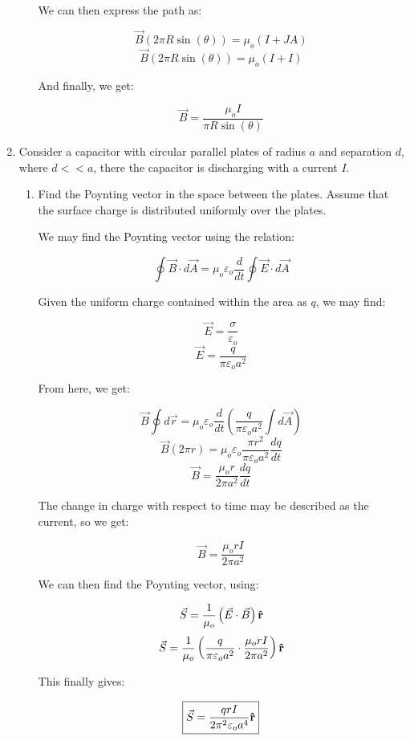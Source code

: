 \begin{enumerate}
\begin{enumerate}
        We can then express the path as:

        $$\vec{B}(2\pi R\sin(\theta))=\mu_o(I+JA)$$
        $$\vec{B}(2\pi R\sin(\theta))=\mu_o(I+I)$$

        And finally, we get:

        $$\boxed{\vec{B}=\frac{\mu_o I}{\pi R\sin(\theta)}}$$

    \end{enumerate}

  \item Consider a capacitor with circular parallel plates of radius $a$ and separation $d$, where $d<<a$, there the capacitor is discharging with a current $I$.

    \begin{enumerate}

      \item Find the Poynting vector in the space between the plates. Assume that the surface charge is distributed uniformly over the plates.

        We may find the Poynting vector using the relation:

        $$\oint \vec{B}\cdot d\vec{A}=\mu_o\varepsilon_o\frac{d}{dt}\oint \vec{E}\cdot d\vec{A}$$

        Given the uniform charge contained within the area as $q$, we may find:

        $$\vec{E}=\frac{\sigma}{\varepsilon_o}$$
        $$\vec{E}=\frac{q}{\pi\varepsilon_o a^2}$$

        From here, we get:

        $$\vec{B}\oint d\vec{r}=\mu_o\varepsilon_o\frac{d}{dt}\left(\frac{q}{\pi\varepsilon_o a^2} \int d\vec{A}\right)$$
        $$\vec{B}(2\pi r)=\mu_o\varepsilon_o\frac{\pi r^2}{\pi\varepsilon_o a^2}\frac{dq}{dt}$$
        $$\vec{B}=\frac{\mu_or}{2\pi a^2}\frac{dq}{dt}$$

        The change in charge with respect to time may be described as the current, so we get:

        $$\vec{B}=\frac{\mu_orI}{2\pi a^2}$$

        We can then find the Poynting vector, using:

        $$\vec{S}=\frac{1}{\mu_o}\left( \vec{E}\cdot\vec{B} \right)\bold{\hat{r}}$$
        $$\vec{S}=\frac{1}{\mu_o}\left( \frac{q}{\pi\varepsilon_o a^2}\cdot\frac{\mu_orI}{2\pi a^2} \right)\bold{\hat{r}}$$

        This finally gives:

        $$\boxed{\vec{S}=\frac{qrI}{2\pi^2\varepsilon_o a^4}\bold{\hat{r}}}$$


\end{enumerate}
\end{enumerate}
